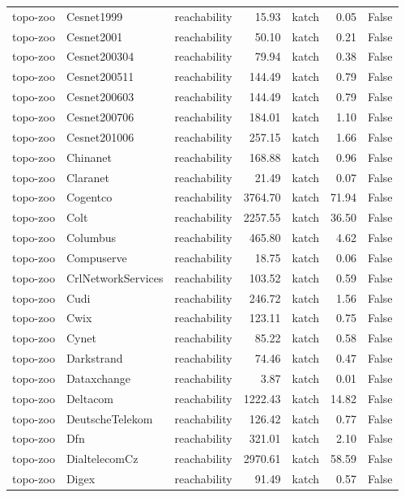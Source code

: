 \begin{tabular}{lllrlrr}
topo-zoo & Cesnet1999 & reachability & 15.93 & katch & 0.05 & False \\
topo-zoo & Cesnet2001 & reachability & 50.10 & katch & 0.21 & False \\
topo-zoo & Cesnet200304 & reachability & 79.94 & katch & 0.38 & False \\
topo-zoo & Cesnet200511 & reachability & 144.49 & katch & 0.79 & False \\
topo-zoo & Cesnet200603 & reachability & 144.49 & katch & 0.79 & False \\
topo-zoo & Cesnet200706 & reachability & 184.01 & katch & 1.10 & False \\
topo-zoo & Cesnet201006 & reachability & 257.15 & katch & 1.66 & False \\
topo-zoo & Chinanet & reachability & 168.88 & katch & 0.96 & False \\
topo-zoo & Claranet & reachability & 21.49 & katch & 0.07 & False \\
topo-zoo & Cogentco & reachability & 3764.70 & katch & 71.94 & False \\
topo-zoo & Colt & reachability & 2257.55 & katch & 36.50 & False \\
topo-zoo & Columbus & reachability & 465.80 & katch & 4.62 & False \\
topo-zoo & Compuserve & reachability & 18.75 & katch & 0.06 & False \\
topo-zoo & CrlNetworkServices & reachability & 103.52 & katch & 0.59 & False \\
topo-zoo & Cudi & reachability & 246.72 & katch & 1.56 & False \\
topo-zoo & Cwix & reachability & 123.11 & katch & 0.75 & False \\
topo-zoo & Cynet & reachability & 85.22 & katch & 0.58 & False \\
topo-zoo & Darkstrand & reachability & 74.46 & katch & 0.47 & False \\
topo-zoo & Dataxchange & reachability & 3.87 & katch & 0.01 & False \\
topo-zoo & Deltacom & reachability & 1222.43 & katch & 14.82 & False \\
topo-zoo & DeutscheTelekom & reachability & 126.42 & katch & 0.77 & False \\
topo-zoo & Dfn & reachability & 321.01 & katch & 2.10 & False \\
topo-zoo & DialtelecomCz & reachability & 2970.61 & katch & 58.59 & False \\
topo-zoo & Digex & reachability & 91.49 & katch & 0.57 & False \\

\end{tabular}
